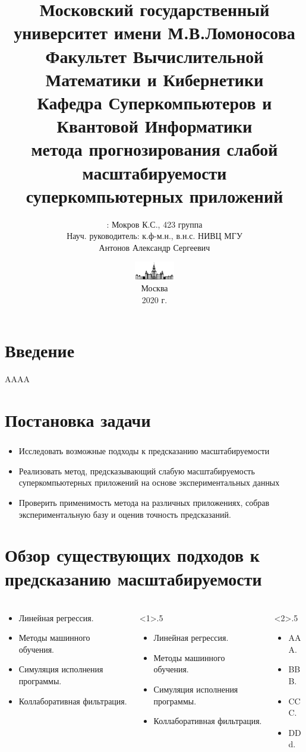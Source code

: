 \documentclass[unicode, t]{beamer}%
\title{
	{\footnotesize\color{black}Московский государственный университет имени М.В.Ломоносова\\
    Факультет Вычислительной Математики и Кибернетики\\
    Кафедра Суперкомпьютеров и Квантовой Информатики\\}
    \vspace{\baselineskip}
    {\LARGEРазработка метода прогнозирования слабой масштабируемости суперкомпьютерных приложений}
}
\author{\footnotesizeСтудент: Мокров К.С., 423 группа\\
		Науч. руководитель: к.ф-м.н.,
		в.н.с. НИВЦ МГУ\\
		Антонов Александр Сергеевич}
\date{\includegraphics[height=0.8cm]{./images/MSU}\\
	  \scriptsize
	  Москва\\
	  2020 г.}
\begin{document}
\frame[plain]{\titlepage}	%

\section{Введение}
\begin{frame}
AAAA
\end{frame}

\section{Постановка задачи}
\begin{frame}
	\frametitle{\insertsection}
	\begin{itemize}
		\item Исследовать возможные подходы к предсказанию масштабируемости
		\item Реализовать метод, предсказывающий слабую масштабируемость суперкомпьютерных приложений на основе экспериментальных данных
		\item Проверить применимость метода на различных приложениях, собрав экспериментальную базу и оценив точность предсказаний.
	\end{itemize}
\end{frame}

\section{Обзор существующих подходов к предсказанию масштабируемости}
\begin{frame}
	\frametitle{\insertsection}
	\begin{columns}
		\begin{column}{.5\textwidth}
			\begin{itemize}
				\item Линейная регрессия.
				\item Методы машинного обучения.
				\item Симуляция исполнения программы.
				\item Коллаборативная фильтрация.
			\end{itemize}
		\end{column}
		\begin{column}<1>{.5\textwidth}
			\begin{itemize}
				\item Линейная регрессия.
				\item Методы машинного обучения.
				\item Симуляция исполнения программы.
				\item Коллаборативная фильтрация.
			\end{itemize}
		\end{column}
		\begin{column}<2>{.5\textwidth}
			\begin{itemize}
				\item AAA.
				\item BBB.
				\item CCC.
				\item DDd.
			\end{itemize}
		\end{column}
	\end{columns}
\end{frame}
\end{document}
